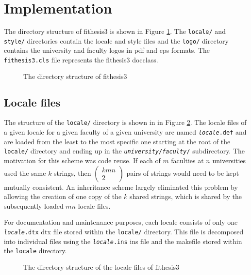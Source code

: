 \documentclass[12pt,twoside,color,table]%
  {fithesis3/fithesis3/fithesis3} %
\begin{document}
  \section{Implementation}
  The directory structure of \textsf{fithesis3} is shown in Figure
  \ref{fig:dirs}. The \texttt{locale/} and \texttt{style/}
  directories contain the locale and style files and the
  \texttt{logo/} directory contains the university
  and faculty logos in \gls{pdf} and \gls{eps} formats. The
  \texttt{fithesis3.cls} file represents the \textsf{fithesis3}
  \gls{docclass}.

  \begin{figure}
    \centering
    \parbox{0.5\textwidth}{}
    \caption{The directory structure of \textsf{fithesis3}}
    \label{fig:dirs}
  \end{figure}
  
  \subsection{Locale files}
  The structure of the \texttt{locale/} directory is shown in in
  Figure \ref{fig:dirs-locale}. The locale files of a given
  locale for a given faculty of a given university are named
  \texttt{\textit{locale}.def} and are
  loaded from the least to the most specific one starting at the
  root of the \texttt{locale/} directory and ending up in the
  \texttt{\textit{university}/\textit{faculty}/}
  subdirectory. The motivation for this
  scheme was code reuse. If each of $m$ faculties at $n$
  universities used the same $k$ strings, then $(\begin{smallmatrix}
  kmn\\2\end{smallmatrix})$ pairs of strings would need to be kept
  mutually consistent. An inheritance scheme largely eliminated
  this problem by allowing the creation of one copy of the $k$
  shared strings, which is shared by the subsequently loaded $mn$
  locale files.

  For documentation and maintenance purposes, each locale consists
  of only one \texttt{\textit{locale}.dtx} \gls{dtx} file stored
  within the \texttt{locale/} directory. This file is decomposed
  into individual files using the \texttt{\textit{locale}.ins}
  \gls{ins} file and the \gls{makefile} stored within the
  \texttt{locale} directory.

  \begin{figure}
    \centering
    \parbox{0.5\textwidth}{}
    \caption{The directory structure of the locale files of
      \textsf{fithesis3}}
    \label{fig:dirs-locale}
  \end{figure}
  
\end{document}
